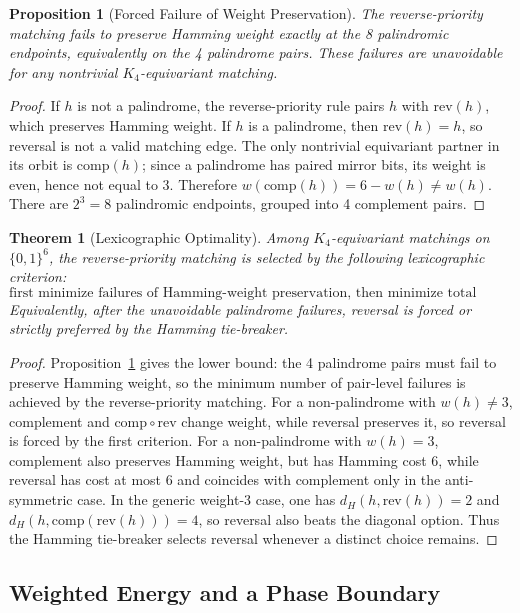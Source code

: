\documentclass[11pt]{article}
\theoremstyle{definition}
\theoremstyle{plain}
\newtheorem{theorem}[definition]{Theorem}
\newtheorem{proposition}[definition]{Proposition}
\newcommand{\B}{\{0,1\}}
\newcommand{\Ham}{d_H}
\newcommand{\comp}{\mathrm{comp}}
\newcommand{\rev}{\mathrm{rev}}
\begin{document}
\begin{proposition}[Forced Failure of Weight Preservation]\label{prop:forcedviolations}
The reverse-priority matching fails to preserve Hamming weight exactly at the 8 palindromic endpoints, equivalently on the 4 palindrome pairs. These failures are unavoidable for any nontrivial $K_4$-equivariant matching.
\end{proposition}

\begin{proof}
If $h$ is not a palindrome, the reverse-priority rule pairs $h$ with $\rev(h)$, which preserves Hamming weight. If $h$ is a palindrome, then $\rev(h)=h$, so reversal is not a valid matching edge. The only nontrivial equivariant partner in its orbit is $\comp(h)$; since a palindrome has paired mirror bits, its weight is even, hence not equal to $3$. Therefore $w(\comp(h))=6-w(h)\neq w(h)$. There are $2^3=8$ palindromic endpoints, grouped into 4 complement pairs.
\end{proof}

\begin{theorem}[Lexicographic Optimality]\label{thm:lex}
Among $K_4$-equivariant matchings on $\B^6$, the reverse-priority matching is selected by the following lexicographic criterion:
\[
\text{first minimize failures of Hamming-weight preservation, then minimize total Hamming cost.}
\]
Equivalently, after the unavoidable palindrome failures, reversal is forced or strictly preferred by the Hamming tie-breaker.
\end{theorem}

\begin{proof}
Proposition~\ref{prop:forcedviolations} gives the lower bound: the 4 palindrome pairs must fail to preserve Hamming weight, so the minimum number of pair-level failures is achieved by the reverse-priority matching. For a non-palindrome with $w(h)\neq 3$, complement and $\comp\circ\rev$ change weight, while reversal preserves it, so reversal is forced by the first criterion. For a non-palindrome with $w(h)=3$, complement also preserves Hamming weight, but has Hamming cost $6$, while reversal has cost at most $6$ and coincides with complement only in the anti-symmetric case. In the generic weight-$3$ case, one has $\Ham(h,\rev(h))=2$ and $\Ham(h,\comp(\rev(h)))=4$, so reversal also beats the diagonal option. Thus the Hamming tie-breaker selects reversal whenever a distinct choice remains.
\end{proof}

\subsection{Weighted Energy and a Phase Boundary}
\end{document}
